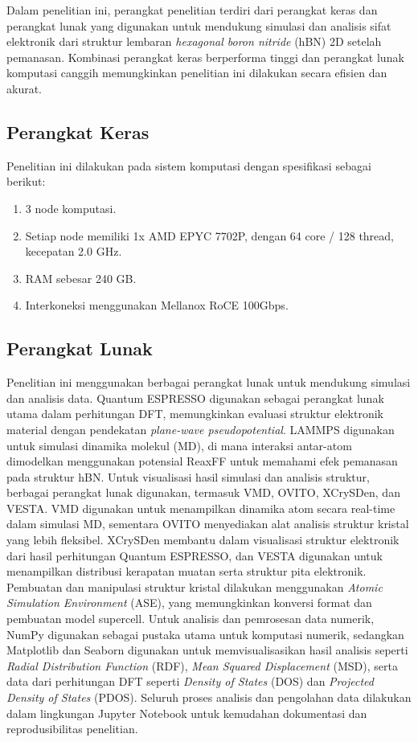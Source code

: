 Dalam penelitian ini, perangkat penelitian terdiri dari perangkat keras dan perangkat lunak yang digunakan untuk mendukung simulasi dan analisis sifat elektronik dari struktur lembaran \textit{hexagonal boron nitride} (hBN) 2D setelah pemanasan. Kombinasi perangkat keras berperforma tinggi dan perangkat lunak komputasi canggih memungkinkan penelitian ini dilakukan secara efisien dan akurat. \subsection{Perangkat Keras}
Penelitian ini dilakukan pada sistem komputasi dengan spesifikasi sebagai berikut:
\begin{enumerate}
    \item 3 node komputasi. \item Setiap node memiliki 1x AMD EPYC 7702P, dengan 64 core / 128 thread, kecepatan 2.0 GHz. \item RAM sebesar 240 GB.
    \item Interkoneksi menggunakan Mellanox RoCE 100Gbps. \end{enumerate}

\subsection{Perangkat Lunak}
Penelitian ini menggunakan berbagai perangkat lunak untuk mendukung simulasi dan analisis data. Quantum ESPRESSO digunakan sebagai perangkat lunak utama dalam perhitungan DFT, memungkinkan evaluasi struktur elektronik material dengan pendekatan \textit{plane-wave pseudopotential}. LAMMPS digunakan untuk simulasi dinamika molekul (MD), di mana interaksi antar-atom dimodelkan menggunakan potensial ReaxFF untuk memahami efek pemanasan pada struktur hBN. Untuk visualisasi hasil simulasi dan analisis struktur, berbagai perangkat lunak digunakan, termasuk VMD, OVITO, XCrySDen, dan VESTA. VMD digunakan untuk menampilkan dinamika atom secara real-time dalam simulasi MD, sementara OVITO menyediakan alat analisis struktur kristal yang lebih fleksibel. XCrySDen membantu dalam visualisasi struktur elektronik dari hasil perhitungan Quantum ESPRESSO, dan VESTA digunakan untuk menampilkan distribusi kerapatan muatan serta struktur pita elektronik. Pembuatan dan manipulasi struktur kristal dilakukan menggunakan \textit{Atomic Simulation Environment} (ASE), yang memungkinkan konversi format dan pembuatan model supercell. Untuk analisis dan pemrosesan data numerik, NumPy digunakan sebagai pustaka utama untuk komputasi numerik, sedangkan Matplotlib dan Seaborn digunakan untuk memvisualisasikan hasil analisis seperti \textit{Radial Distribution Function} (RDF), \textit{Mean Squared Displacement} (MSD), serta data dari perhitungan DFT seperti \textit{Density of States} (DOS) dan \textit{Projected Density of States} (PDOS). Seluruh proses analisis dan pengolahan data dilakukan dalam lingkungan Jupyter Notebook untuk kemudahan dokumentasi dan reprodusibilitas penelitian. %
